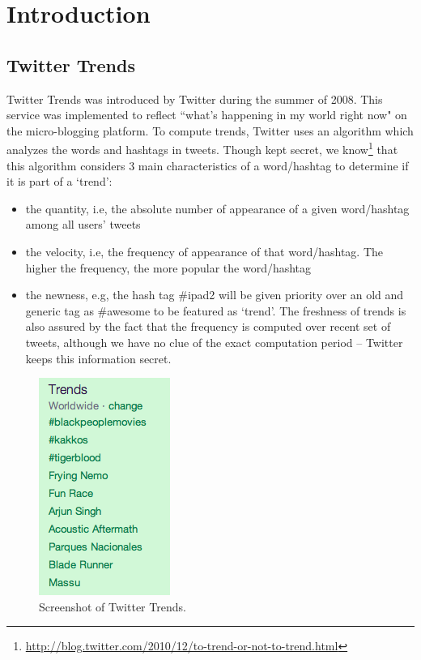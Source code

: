 \documentclass[runningheads,a4paper]{llncs}
\begin{document}
\section{Introduction}

\subsection{Twitter Trends}

Twitter Trends was introduced by Twitter during the summer of 2008. This service was implemented to reflect ``what's happening in my world right now" on the micro-blogging platform.
To compute trends, Twitter uses an algorithm which analyzes the words and hashtags in tweets. Though kept secret, we know\footnote{\url{http://blog.twitter.com/2010/12/to-trend-or-not-to-trend.html}} that this algorithm considers 3 main characteristics of a word/hashtag to determine if it is part of a `trend':
\clearpage
\begin{itemize}
\item the quantity, i.e, the absolute number of appearance of a given word/hashtag among all users' tweets
\item the velocity, i.e, the frequency of appearance of that word/hashtag. The higher the frequency, the more popular the word/hashtag
\item the newness, e.g, the hash tag \#ipad2 will be given priority over an old and generic tag as \#awesome to be featured as `trend'. The freshness of trends is also assured by the fact that the frequency is computed over recent set of tweets, although we have no clue of the exact computation period -- Twitter keeps this information secret.
\end{itemize}
\begin{figure}[h!]
  \centering
    \includegraphics[width=0.17\linewidth]{twitter-trends.png}
  \caption{Screenshot of Twitter Trends.}
  \label{fig:dataflow}
\end{figure}
\end{document}
